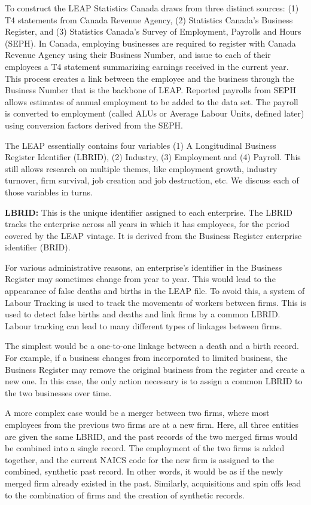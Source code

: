 \documentclass{article}
\begin{document}
To construct the LEAP Statistics Canada draws from three distinct sources: (1) T4 statements from Canada Revenue Agency, (2) Statistics Canada's Business Register, and (3) Statistics Canada's Survey of Employment, Payrolls and Hours (SEPH). In Canada, employing businesses are required to register with Canada Revenue Agency using their Business Number, and issue to each of their employees a T4 statement summarizing earnings received in the current year. This process creates a link between the employee and the business through the Business Number that is the backbone of LEAP. Reported payrolls from SEPH allows estimates of annual employment to be added to the data set. The payroll is converted to employment (called ALUs or Average Labour Units, defined later) using conversion factors derived from the SEPH. 

The LEAP essentially contains four variables (1) A Longitudinal Business Register Identifier (LBRID), (2) Industry, (3) Employment and (4) Payroll. This still allows research on multiple themes, like employment growth, industry turnover, firm survival, job creation and job destruction, etc. We discuss each of those variables in turns. 

\textbf{LBRID:} This is the unique identifier assigned to each enterprise.  The LBRID tracks the enterprise across all years in which it has employees, for the period covered by the LEAP vintage. It is derived from the Business Register enterprise identifier (BRID). 

For various administrative reasons, an enterprise's identifier in the Business Register may sometimes change from year to year.  This would lead to the appearance of false deaths and births in the LEAP file.  To avoid this, a system of Labour Tracking is used to track the movements of workers between firms.  This is used to detect false births and deaths and link firms by a common LBRID. Labour tracking can lead to many different types of linkages between firms. 

The simplest would be a one-to-one linkage between a death and a birth record. For example, if a business changes from incorporated to limited business, the Business Register may remove the original business from the register and create a new one. In this case, the only action necessary is to assign a common LBRID to the two businesses over time. 

A more complex case would be a merger between two firms, where most employees from the previous two firms are at a new firm. Here, all three entities are given the same LBRID, and the past records of the two merged firms would be combined into a single record. The employment of the two firms is added together, and the current NAICS code for the new firm is assigned to the combined, synthetic past record. In other words, it would be as if the newly merged firm already existed in the past. Similarly, acquisitions and spin offs lead to the combination of firms and the creation of synthetic records. 
\end{document}
